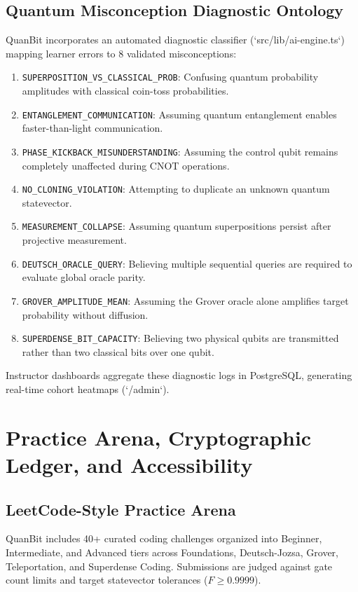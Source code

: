 \documentclass[conference]{IEEEtran}
\begin{document}
\subsection{Quantum Misconception Diagnostic Ontology}
QuanBit incorporates an automated diagnostic classifier (`src/lib/ai-engine.ts`) mapping learner errors to 8 validated misconceptions:
\begin{enumerate}[leftmargin=*,itemsep=2pt]
    \item \texttt{SUPERPOSITION\_VS\_CLASSICAL\_PROB}: Confusing quantum probability amplitudes with classical coin-toss probabilities.
    \item \texttt{ENTANGLEMENT\_COMMUNICATION}: Assuming quantum entanglement enables faster-than-light communication.
    \item \texttt{PHASE\_KICKBACK\_MISUNDERSTANDING}: Assuming the control qubit remains completely unaffected during CNOT operations.
    \item \texttt{NO\_CLONING\_VIOLATION}: Attempting to duplicate an unknown quantum statevector.
    \item \texttt{MEASUREMENT\_COLLAPSE}: Assuming quantum superpositions persist after projective measurement.
    \item \texttt{DEUTSCH\_ORACLE\_QUERY}: Believing multiple sequential queries are required to evaluate global oracle parity.
    \item \texttt{GROVER\_AMPLITUDE\_MEAN}: Assuming the Grover oracle alone amplifies target probability without diffusion.
    \item \texttt{SUPERDENSE\_BIT\_CAPACITY}: Believing two physical qubits are transmitted rather than two classical bits over one qubit.
\end{enumerate}
Instructor dashboards aggregate these diagnostic logs in PostgreSQL, generating real-time cohort heatmaps (`/admin`).

\section{Practice Arena, Cryptographic Ledger, and Accessibility}
\label{sec:practice_ledger}

\subsection{LeetCode-Style Practice Arena}
QuanBit includes 40+ curated coding challenges organized into Beginner, Intermediate, and Advanced tiers across Foundations, Deutsch-Jozsa, Grover, Teleportation, and Superdense Coding. Submissions are judged against gate count limits and target statevector tolerances ($F \ge 0.9999$).
\end{document}
